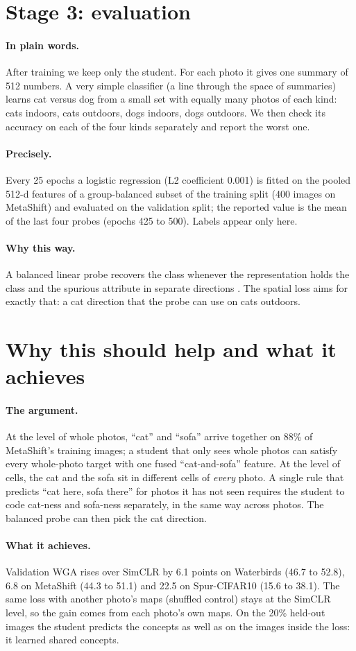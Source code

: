 \documentclass[11pt]{article}
\newcommand{\plain}{\paragraph{In plain words.}}
\newcommand{\precise}{\paragraph{Precisely.}}
\newcommand{\why}{\paragraph{Why this way.}}
\begin{document}
\section{Stage 3: evaluation}
\plain After training we keep only the student. For each photo it gives one summary of 512 numbers. A very simple
classifier (a line through the space of summaries) learns cat versus dog from a small set with equally many photos of
each kind: cats indoors, cats outdoors, dogs indoors, dogs outdoors. We then check its accuracy on each of the four
kinds separately and report the worst one.

\precise Every 25 epochs a logistic regression (L2 coefficient 0.001) is fitted on the pooled 512-d features of a
group-balanced subset of the training split (400 images on MetaShift) and evaluated on the validation split; the
reported value is the mean of the last four probes (epochs 425 to 500). Labels appear only here.

\why A balanced linear probe recovers the class whenever the representation holds the class and the spurious attribute
in separate directions \citep{kirichenko2023dfr}. The spatial loss aims for exactly that: a cat direction that the
probe can use on cats outdoors.

\section{Why this should help and what it achieves}
\paragraph{The argument.} At the level of whole photos, ``cat'' and ``sofa'' arrive together on 88\% of MetaShift's
training images; a student that only sees whole photos can satisfy every whole-photo target with one fused
``cat-and-sofa'' feature. At the level of cells, the cat and the sofa sit in different cells of \emph{every} photo. A
single rule that predicts ``cat here, sofa there'' for photos it has not seen requires the student to code cat-ness and
sofa-ness separately, in the same way across photos. The balanced probe can then pick the cat direction.

\paragraph{What it achieves.} Validation WGA rises over SimCLR by 6.1 points on Waterbirds (46.7 to 52.8), 6.8 on
MetaShift (44.3 to 51.1) and 22.5 on Spur-CIFAR10 (15.6 to 38.1). The same loss with another photo's maps (shuffled
control) stays at the SimCLR level, so the gain comes from each photo's own maps. On the 20\% held-out images the student
predicts the concepts as well as on the images inside the loss: it learned shared concepts.
\end{document}
